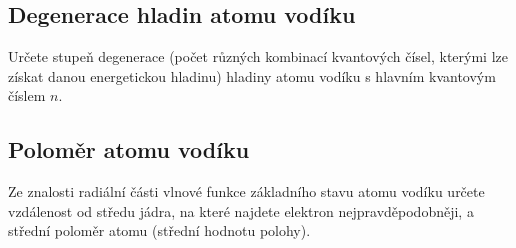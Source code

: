 \subsection{Degenerace hladin atomu vodíku}
    Určete stupeň degenerace (počet různých kombinací kvantových čísel, kterými lze získat danou energetickou hladinu) hladiny atomu vodíku s hlavním kvantovým číslem $n$.

\subsection{Poloměr atomu vodíku}
    Ze znalosti radiální části vlnové funkce základního stavu atomu vodíku určete vzdálenost od středu jádra, na které najdete elektron nejpravděpodobněji, a střední poloměr atomu (střední hodnotu polohy).
